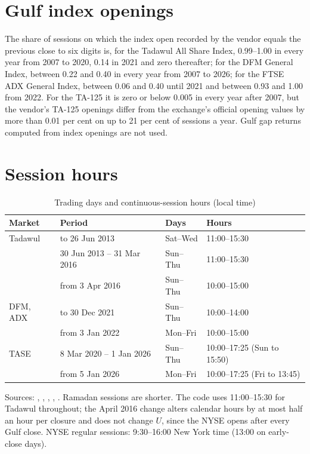 \FloatBarrier
\section{Gulf index openings}\label{app:index}
The share of sessions on which the index open recorded by the vendor equals the previous close to six digits is, for the Tadawul All Share Index, 0.99--1.00 in every year from 2007 to 2020, 0.14 in 2021 and zero thereafter; for the DFM General Index, between 0.22 and 0.40 in every year from 2007 to 2026; for the FTSE ADX General Index, between 0.06 and 0.40 until 2021 and between 0.93 and 1.00 from 2022. For the TA-125 it is zero or below 0.005 in every year after 2007, but the vendor's TA-125 openings differ from the exchange's official opening values by more than 0.01 per cent on up to 21 per cent of sessions a year. Gulf gap returns computed from index openings are not used.

\FloatBarrier
\section{Session hours}\label{app:hours}
\begin{table}[h]
\centering
\begin{threeparttable}
\caption{Trading days and continuous-session hours (local time)}\label{tab:hours}
\footnotesize
\begin{tabular}{llll}
\toprule
Market & Period & Days & Hours \\
\midrule
Tadawul & to 26 Jun 2013 & Sat--Wed & 11:00--15:30 \\
 & 30 Jun 2013 -- 31 Mar 2016 & Sun--Thu & 11:00--15:30 \\
 & from 3 Apr 2016 & Sun--Thu & 10:00--15:00 \\
DFM, ADX & to 30 Dec 2021 & Sun--Thu & 10:00--14:00 \\
 & from 3 Jan 2022 & Mon--Fri & 10:00--15:00 \\
TASE & 8 Mar 2020 -- 1 Jan 2026 & Sun--Thu & 10:00--17:25 (Sun to 15:50) \\
 & from 5 Jan 2026 & Mon--Fri & 10:00--17:25 (Fri to 13:45) \\
\bottomrule
\end{tabular}
\begin{tablenotes}\footnotesize
\item Sources: \citet{Alsayari2022}, \citet{Mubasher2016}, \citet{National2021}, \citet{TASE2025}, \citet{WFE2020}. Ramadan sessions are shorter. The code uses 11:00--15:30 for Tadawul throughout; the April 2016 change alters calendar hours by at most half an hour per closure and does not change $U$, since the NYSE opens after every Gulf close. NYSE regular sessions: 9:30--16:00 New York time (13:00 on early-close days).
\end{tablenotes}
\end{threeparttable}
\end{table}

